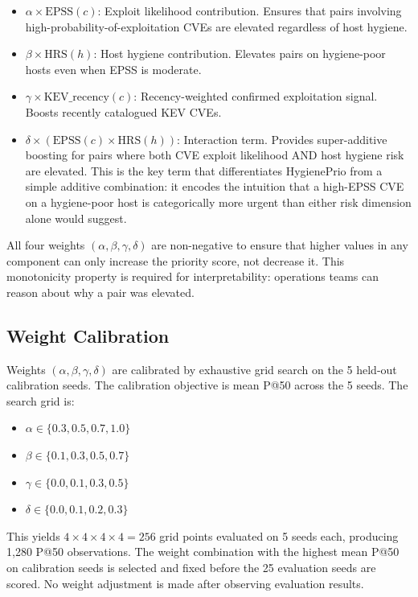 \begin{itemize}
 \item $\alpha \times \mathrm{EPSS}(c)$: Exploit likelihood contribution. Ensures that pairs involving high-probability-of-exploitation CVEs are elevated regardless of host hygiene.
 \item $\beta \times \mathrm{HRS}(h)$: Host hygiene contribution. Elevates pairs on hygiene-poor hosts even when EPSS is moderate.
 \item $\gamma \times \mathrm{KEV\_recency}(c)$: Recency-weighted confirmed exploitation signal. Boosts recently catalogued KEV CVEs.
 \item $\delta \times (\mathrm{EPSS}(c) \times \mathrm{HRS}(h))$: Interaction term. Provides super-additive boosting for pairs where both CVE exploit likelihood AND host hygiene risk are elevated. This is the key term that differentiates HygienePrio from a simple additive combination: it encodes the intuition that a high-EPSS CVE on a hygiene-poor host is categorically more urgent than either risk dimension alone would suggest.
\end{itemize}

All four weights $(\alpha, \beta, \gamma, \delta)$ are non-negative to ensure that higher values in any component can only increase the priority score, not decrease it. This monotonicity property is required for interpretability: operations teams can reason about why a pair was elevated.

\subsection{Weight Calibration}

Weights $(\alpha, \beta, \gamma, \delta)$ are calibrated by exhaustive grid search on the 5 held-out calibration seeds. The calibration objective is mean P@50 across the 5 seeds. The search grid is:

\begin{itemize}
 \item $\alpha \in \{0.3, 0.5, 0.7, 1.0\}$
 \item $\beta \in \{0.1, 0.3, 0.5, 0.7\}$
 \item $\gamma \in \{0.0, 0.1, 0.3, 0.5\}$
 \item $\delta \in \{0.0, 0.1, 0.2, 0.3\}$
\end{itemize}

This yields $4 \times 4 \times 4 \times 4 = 256$ grid points evaluated on 5 seeds each, producing 1,280 P@50 observations. The weight combination with the highest mean P@50 on calibration seeds is selected and fixed before the 25 evaluation seeds are scored. No weight adjustment is made after observing evaluation results.

